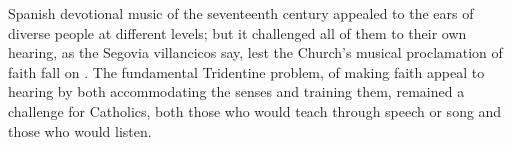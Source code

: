 \label{fig:Covarrubias-Emblemas-202-ears-thorns}

Spanish devotional music of the seventeenth century appealed to the ears of diverse people at different levels; but it challenged all of them to  their own hearing, as the Segovia villancicos say, lest the Church's musical proclamation of faith fall on .
The fundamental Tridentine problem, of making faith appeal to hearing by both accommodating the senses and training them, remained a challenge for Catholics, both those who would teach through speech or song and those who would listen.



